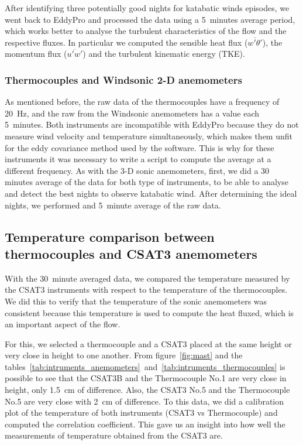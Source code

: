 After identifying three potentially good nights for katabatic winds episodes, we went back to EddyPro and processed the data using a 5~minutes average period, which works better to analyse the turbulent characteristics of the flow and the respective fluxes. In particular we computed the sensible heat flux ($\overline{w'\theta'}$), the momentum flux ($\overline{u'w'}$) and the turbulent kinematic energy (TKE).

\subsubsection{Thermocouples and Windsonic 2-D anemometers}

As mentioned before, the raw data of the thermocouples have a frequency of 20~Hz, and the raw from the Windsonic anemometers has a value each 5~minutes. Both instruments are incompatible with EddyPro because they do not measure wind velocity and temperature simultaneously, which makes them unfit for the eddy covariance method used by the software. This is why for these instruments it was necessary to write a script to compute the average at a different frequency. As with the 3-D sonic anemometers, first, we did a 30 minutes average of the data for both type of instruments, to be able to analyse and detect the best nights to observe katabatic wind. After determining the ideal nights, we performed and 5~minute average of the raw data.

\subsection{Temperature comparison between thermocouples and CSAT3 anemometers}

With the 30~minute averaged data, we compared the temperature measured by the CSAT3 instruments with respect to the temperature of the thermocouples. We did this to verify that the temperature of the sonic anemometers was consistent because this temperature is used to compute the heat fluxed, which is an important aspect of the flow. 

For this, we selected a thermocouple and a CSAT3 placed at the same height or very close in height to one another. From figure~\ref{fig:mast} and the tables~\ref{tab:intruments_anemometers}~and~\ref{tab:intruments_thermocouples} is possible to see that the CSAT3B and the Thermocouple No.1 are very close in height, only 1.5~cm of difference. Also, the CSAT3 No.5 and the Thermocouple No.5 are very close with 2~cm of difference. To this data, we did a calibration plot of the temperature of both instruments (CSAT3 vs Thermocouple) and computed the correlation coefficient. This gave us an insight into how well the measurements of temperature obtained from the CSAT3 are. 

